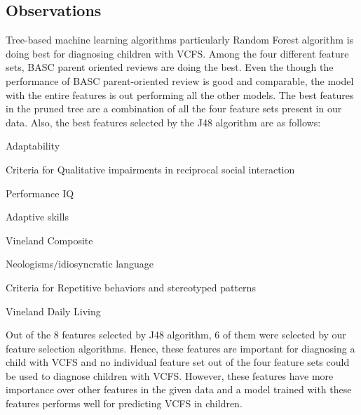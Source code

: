 \subsection{Observations}
Tree-based machine learning algorithms particularly Random Forest algorithm is doing best for diagnosing children with VCFS. Among the four different feature sets, BASC parent oriented reviews are doing the best. Even the though the performance of BASC parent-oriented review is good and comparable, the model with the entire features is out performing all the other models. The best features in the pruned tree are a combination of all the four feature sets present in our data.  Also, the best features selected by the J48 algorithm are as follows:
\begin{compactenum}
\item Adaptability
\item Criteria for Qualitative impairments in reciprocal social interaction
\item Performance IQ
\item Adaptive skills
\item Vineland Composite
\item Neologisms/idiosyncratic language
\item Criteria for Repetitive behaviors and stereotyped patterns
\item Vineland Daily Living
\end{compactenum}
Out of the 8 features selected by J48 algorithm, 6 of them were selected by our feature selection algorithms. Hence, these features are important for diagnosing a child with VCFS and no individual feature set out of the four feature sets could be used to diagnose children with VCFS. However, these features have more importance over other features in the given data and a model trained with these features performs well for predicting VCFS in children.
